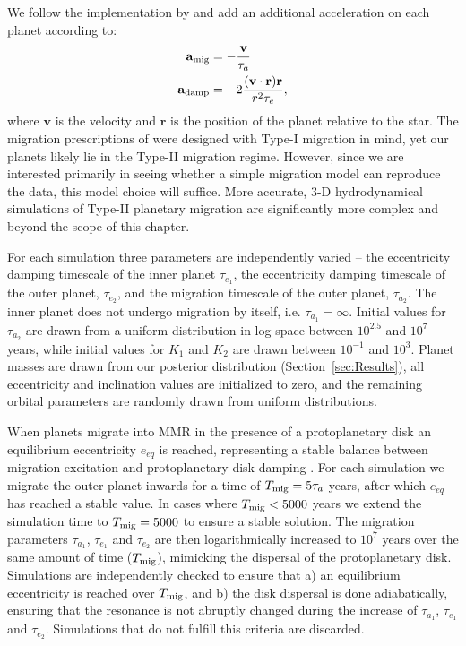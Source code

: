 We follow the implementation by \cite{Papa2000} and add an additional acceleration on each planet according to:
\begin{align*}
\begin{split}
\textbf{a}_{\rm mig} &=  -\frac{\textbf{v}}{\tau_a} \\
\textbf{a}_{\rm damp} &= -2\frac{(\textbf{v}\cdot\textbf{r})\textbf{r}}{r^2\tau_e},
\end{split}
\end{align*}
where $\textbf{v}$ is the velocity and $\textbf{r}$ is the position of the planet relative to the star. 
The migration prescriptions of \citet{Papa2000} were designed with Type-I migration in mind, yet our planets likely lie in the Type-II migration regime.
However, since we are interested primarily in seeing whether a simple migration model can reproduce the data, this model choice will suffice. 
More accurate, 3-D hydrodynamical simulations of Type-II planetary migration are significantly more complex and beyond the scope of this chapter. 

For each simulation three parameters are independently varied -- the eccentricity damping timescale of the inner planet $\tau_{e_1}$, the eccentricity damping timescale of the outer planet, $\tau_{e_2}$, and the migration timescale of the outer planet, $\tau_{a_2}$.
The inner planet does not undergo migration by itself, i.e. $\tau_{a_1} = \infty$.
Initial values for $\tau_{a_2}$ are drawn from a uniform distribution in log-space between $10^{2.5}$ and $10^7$ years, while initial values for $K_1$ and $K_2$ are drawn between $10^{-1}$ and $10^3$.
Planet masses are drawn from our posterior distribution (Section~\ref{sec:Results}), all eccentricity and inclination values are initialized to zero, and the remaining orbital parameters are randomly drawn from uniform distributions. 

When planets migrate into MMR in the presence of a protoplanetary disk an equilibrium eccentricity $e_{eq}$ is reached, representing a stable balance between migration excitation and protoplanetary disk damping \citep[e.g.][]{Goldreich2014}. 
For each simulation we migrate the outer planet inwards for a time of $T_{\rm mig} = 5\tau_a$ years, after which $e_{eq}$ has reached a stable value. 
In cases where $T_{\rm mig} < 5000$ years we extend the simulation time to $T_{\rm mig} = 5000$ to ensure a stable solution. 
The migration parameters $\tau_{a_1}$, $\tau_{e_1}$ and $\tau_{e_2}$ are then logarithmically increased to $10^7$ years over the same amount of time ($T_{\rm mig}$), mimicking the dispersal of the protoplanetary disk. 
Simulations are independently checked to ensure that a) an equilibrium eccentricity is reached over $T_{\rm mig}$, and b) the disk dispersal is done adiabatically, ensuring that the resonance is not abruptly changed during the increase of $\tau_{a_1}$, $\tau_{e_1}$ and $\tau_{e_2}$.
Simulations that do not fulfill this criteria are discarded.

